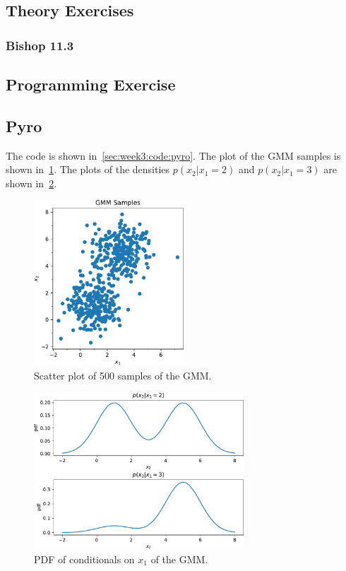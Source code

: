 \subsection{Theory Exercises}

\subsubsection*{Bishop 11.3}

\subsection{Programming Exercise}

\subsection{Pyro}

The code is shown in~\cref{sec:week3:code:pyro}.
The plot of the GMM samples is shown in~\cref{fig:week3:pyro:gmm-samples}.
The plots of the densities $p(x_2 | x_1 = 2)$ and $p(x_2 | x_1 = 3)$
are shown in~\cref{fig:week3:pyro:cond-pdf}.

\begin{figure}[htbp]
  \centering
  \includegraphics[width=0.5\textwidth]{./figures/gmm_samples.pdf}
  \caption{Scatter plot of 500 samples of the GMM.}
  \label{fig:week3:pyro:gmm-samples}
\end{figure}

\begin{figure}[htbp]
  \centering
  \includegraphics[width=0.7\textwidth]{./figures/cond_pdf.pdf}
  \caption{
    PDF of conditionals on $x_1$ of the GMM.
  }
  \label{fig:week3:pyro:cond-pdf}
\end{figure}
